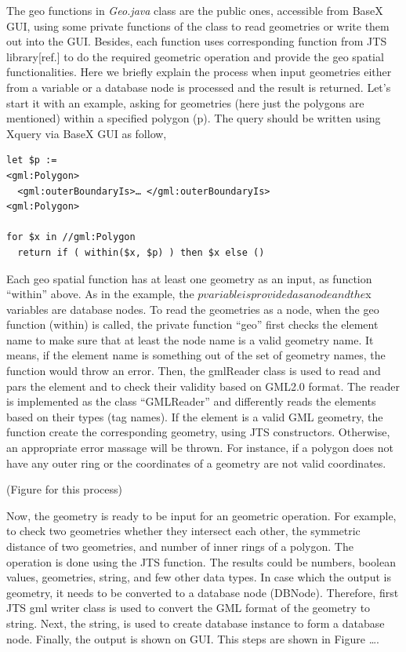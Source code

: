 \documentclass[a4paper,12pt]{article}
\begin{document}
The geo functions in \textit{Geo.java} class are the public ones, accessible from BaseX GUI, using some private functions of the class to read geometries or write them out into the GUI. Besides, each function uses corresponding function from JTS library[ref.] to do the required geometric operation and provide the geo spatial functionalities. Here we briefly explain the process when input geometries either from a variable or a database node is processed and the result is returned.
Let's start it with an example, asking for geometries (here just the polygons are mentioned) within a specified polygon (p). The query should be written using Xquery via BaseX GUI as follow,

\begin{verbatim}
let $p := 
<gml:Polygon>
  <gml:outerBoundaryIs>… </gml:outerBoundaryIs>
<gml:Polygon>
	
for $x in //gml:Polygon
  return if ( within($x, $p) ) then $x else ()
\end{verbatim}

Each geo spatial function has at least one geometry as an input, as function “within” above. As in the example, the $p variable is provided as a node and the $x variables are database nodes. To read the geometries as a node, when the geo function (within) is called, the private function “geo” first checks the element name to make sure that at least the node name is a valid geometry name. It means, if the element name is something out of the set of geometry names, the function would throw an error. 
Then, the gmlReader class is used to read and pars the element and to check their validity based on GML2.0 format. The reader is implemented as the class “GMLReader” and differently reads the elements based on their types (tag names). If the element is a valid GML geometry, the function create the corresponding geometry, using JTS constructors. Otherwise, an appropriate error massage will be thrown. For instance, if a polygon does not have any outer ring or the coordinates of a geometry are not valid coordinates. 

(Figure for this process)

Now, the geometry is ready to be input for an geometric operation. For example, to check two geometries whether they intersect each other, the symmetric distance of two geometries, and number of inner rings of a polygon. The operation is done using the JTS function. The results could be numbers, boolean values, geometries, string, and few other data types. In case which the output is geometry, it needs to be converted to a database node (DBNode). Therefore, first JTS gml writer class is used to convert the GML format of the geometry to string. Next, the string, is used to create database instance to form a database node. Finally, the output is shown on GUI. This steps are shown in Figure ….
\end{document}
